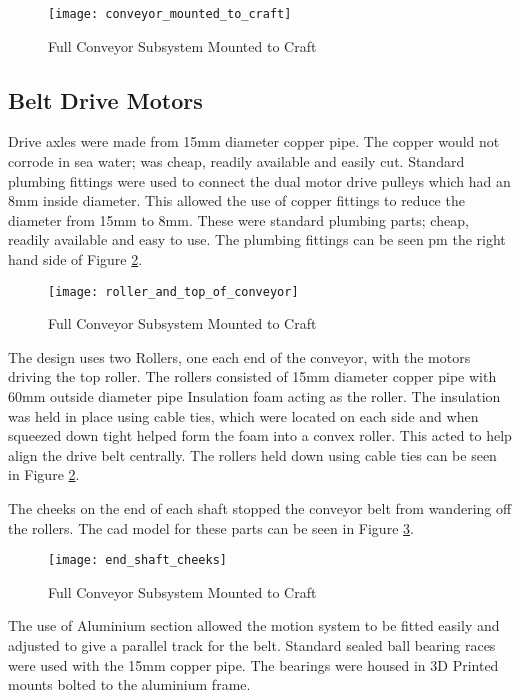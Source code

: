 \documentclass [11pt]{article}
\begin{document}
\begin{figure}[H]
\centerline{\texttt{[image: conveyor\_mounted\_to\_craft]}}
\caption{Full Conveyor Subsystem Mounted to Craft}
\label{fig:conveyor_mounted_to_craft}
\end{figure}

\subsection{Belt Drive Motors}

Drive axles were made from 15mm diameter copper pipe. The copper would not corrode in sea water; was cheap, readily available and easily cut. Standard plumbing fittings were used to connect the dual motor drive pulleys which had an 8mm inside diameter. This allowed the use of copper fittings to reduce the diameter from 15mm to 8mm. These were standard plumbing parts; cheap, readily available and easy to use. The plumbing fittings can be seen pm the right hand side of Figure \ref{fig:roller_and_top_of_conveyor}.

\begin{figure}[H]
\centerline{\texttt{[image: roller\_and\_top\_of\_conveyor]}}
\caption{Full Conveyor Subsystem Mounted to Craft}
\label{fig:roller_and_top_of_conveyor}
\end{figure}

The design uses two Rollers, one each end of the conveyor, with the motors driving the top roller.
The rollers consisted of 15mm diameter copper pipe with 60mm outside diameter pipe Insulation foam acting as the roller. The insulation was held in place using cable ties, which were located on each side and when squeezed down tight helped form the foam into a convex roller. This acted to help align the drive belt centrally. The rollers held down using cable ties can be seen in Figure \ref{fig:roller_and_top_of_conveyor}.

The cheeks on the end of each shaft stopped the conveyor belt from wandering off the rollers. The \gls{cad} model for these parts can be seen in Figure \ref{fig:end_shaft_cheeks}.

\begin{figure}[H]
\centerline{\texttt{[image: end\_shaft\_cheeks]}}
\caption{Full Conveyor Subsystem Mounted to Craft}
\label{fig:end_shaft_cheeks}
\end{figure}

The use of Aluminium section allowed the motion system to be fitted easily and adjusted to give a parallel track for the belt.
Standard sealed ball bearing races were used with the 15mm copper pipe. The bearings were housed in 3D Printed mounts bolted to the aluminium frame.
\end{document}

